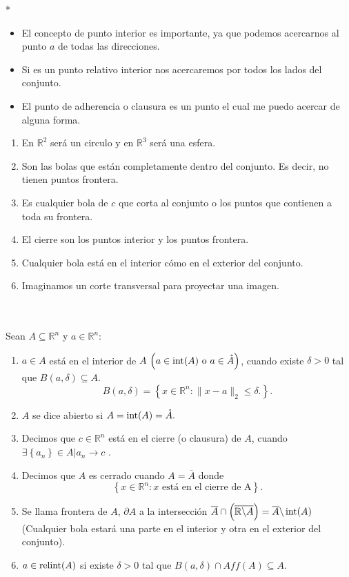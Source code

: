 \begin{paracol}{2}
\switchcolumn[1]*{\noindent\scriptsize
\begin{itemize}
    \item El concepto de punto interior es importante, ya que podemos acercarnos al punto $a$ de todas las direcciones. 
    \item Si es un punto relativo interior nos acercaremos por todos los lados del conjunto.
    \item El punto de adherencia o clausura es un punto el cual me puedo acercar de alguna forma.
\end{itemize}
\begin{enumerate}[1)]
    \item En $\mathbb{R}^2$ será un circulo y en $\mathbb{R}^3$ será una esfera.
    \item Son las bolas que están completamente dentro del conjunto. Es decir, no tienen puntos frontera.
    \item Es cualquier bola de $c$ que corta al conjunto o los puntos que contienen a toda su frontera.
    \item El cierre son los puntos interior y los puntos frontera.
    \item Cualquier bola está en el interior cómo en el exterior del conjunto.
    \item Imaginamos un corte transversal para proyectar una imagen. 
\end{enumerate}
}
\switchcolumn[0]\noindent
\begin{def.}\,\\\\
    Sean $A\subseteq \mathbb{R}^n$ y $a\in \mathbb{R}^n$:
    \begin{enumerate}[1)]
	\item $a\in A$ está en el interior de $A$ $\left(a\in \mathop{\mbox{\normalfont int}}\nolimits(A) \mbox{ o } a\in \mathring{A} \right)$, cuando existe $\delta>0$ tal que $B(a,\delta)\subseteq A.$
	$$B(a,\delta)=\left\{x\in \mathbb{R}^n:\|x-a\|_2 \leq \delta.\right\}.$$
	\item $A$ se dice abierto si $A=\mathop{\mbox{\normalfont int}}\nolimits(A)=\mathring{A}.$ 
	\item Decimos que $c\in\mathbb{R}^n$ está en el cierre (o clausura) de $A$, cuando $\exists \left\{a_n\right\}\in A | a_n\to c$ . 
	\item Decimos que $A$ es cerrado cuando $A=\overline{A}$ donde 
	$$\left\{ x\in \mathbb{R}^n: x \mbox{ está en el cierre de A} \right\}.$$
	\item Se llama frontera de $A$, $\partial{A}$ a la intersección $\overline{A}\cap \left( \overline{\mathbb{R}\backslash A}\right)=\overline{A} \backslash \mathop{\mbox{\normalfont int}}\nolimits(A)$ (Cualquier bola estará una parte en el interior y otra en el exterior del conjunto).
	\item $a\in \mathop{\mbox{\normalfont relint}}\nolimits(A)$ si existe $\delta>0$ tal que $B(a,\delta)\cap Aff(A)\subseteq A$.\\
    \end{enumerate}
\end{def.}



\end{paracol}
